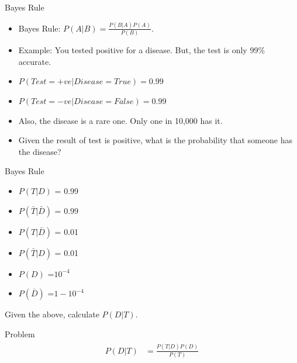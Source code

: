 \documentclass{beamer}
\begin{document}
	

{
	
}

\begin{frame}{Bayes Rule}
\begin{itemize}[<+->]
	\item Bayes Rule: $P(A | B) = \frac{P(B|A)P(A)}{P(B)}$.
	\item Example:  You tested positive for a disease. But, the test is only 99\% accurate.
	\item $P(Test = +ve | Disease = True) = 0.99$
	 \item $P(Test = -ve | Disease = False) = 0.99$
	 \item Also, the disease is a rare one. Only one in 10,000 has it.
	 \item Given the result of test is positive, what is the probability that someone has the disease?
\end{itemize}
\end{frame}

\begin{frame}{Bayes Rule}
\begin{itemize}
	\item $P(T|D)$ = 0.99
	\item $P(\bar{T}|\bar{D})$ = 0.99
	\item $P(T|\bar{D})$ = 0.01
	\item $P(\bar{T}|D)$ = 0.01
	\item $P(D)$ =$ 10^{-4}$
	\item $P(\bar{D})$ =$ 1 - 10^{-4}$
\end{itemize}

Given the above, calculate $P(D|T)$. 
\end{frame}

\begin{frame}{Problem}
\begin{align}
\label{eqn*:eqlabel}
\begin{split}
P(D|T) &= \frac{P(T|D)P(D)}{P(T)}
\end{split}
\end{align}



\end{frame}
\end{document}
